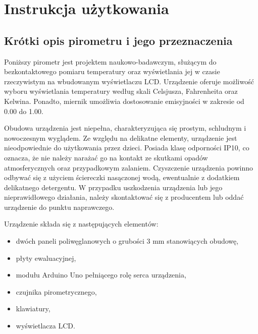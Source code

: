 \chapter{Instrukcja użytkowania}
\section{Krótki opis pirometru i jego przeznaczenia}

Poniższy pirometr jest projektem naukowo-badawczym, służącym do bezkontaktowego pomiaru temperatury oraz wyświetlania jej w czasie rzeczywistym na wbudowanym wyświetlaczu LCD. Urządzenie oferuje możliwość wyboru wyświetlania temperatury według skali Celsjusza, Fahrenheita oraz Kelwina. Ponadto, miernik umożliwia dostosowanie emisyjności w zakresie od 0.00 do 1.00.

\vspace{12pt}

Obudowa urządzenia jest niepełna, charakteryzująca się prostym, schludnym i nowoczesnym wyglądem. Ze względu na delikatne elementy, urządzenie jest nieodpowiednie do użytkowania przez dzieci. Posiada klasę odporności IP10, co oznacza, że nie należy narażać go na kontakt ze skutkami opadów atmosferycznych oraz przypadkowym zalaniem. Czyszczenie urządzenia powinno odbywać się z użyciem ściereczki nasączonej wodą, ewentualnie z dodatkiem delikatnego detergentu. W przypadku uszkodzenia urządzenia lub jego nieprawidłowego działania, należy skontaktować się z producentem lub oddać urządzenie do punktu naprawczego.

\vspace{12pt}

Urządzenie składa się z następujących elementów:
\begin{itemize}
    \item dwóch paneli poliwęglanowych o grubości 3 mm stanowiących obudowę,
    \item płyty ewaluacyjnej,
    \item modułu Arduino Uno pełniącego rolę serca urządzenia,
    \item czujnika pirometrycznego,
    \item klawiatury,
    \item wyświetlacza LCD.
\end{itemize}

